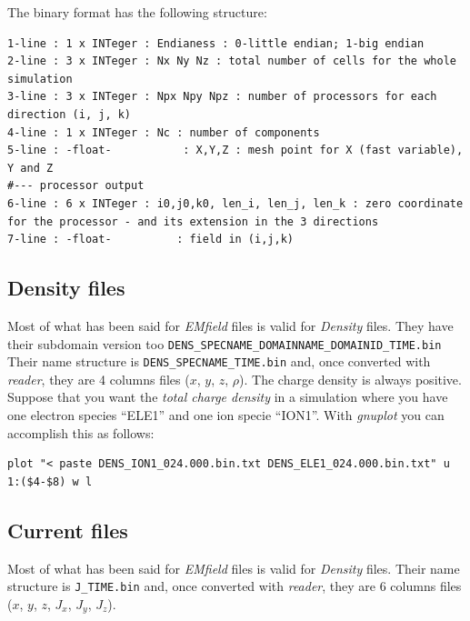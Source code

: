\documentclass[11pt,a4paper]{report}
\begin{document}
The binary format has the following structure:
\begin{verbatim}
1-line : 1 x INTeger : Endianess : 0-little endian; 1-big endian
2-line : 3 x INTeger : Nx Ny Nz : total number of cells for the whole simulation
3-line : 3 x INTeger : Npx Npy Npz : number of processors for each direction (i, j, k)
4-line : 1 x INTeger : Nc : number of components
5-line : -float-           : X,Y,Z : mesh point for X (fast variable), Y and Z
#--- processor output
6-line : 6 x INTeger : i0,j0,k0, len_i, len_j, len_k : zero coordinate for the processor - and its extension in the 3 directions
7-line : -float-          : field in (i,j,k)
\end{verbatim}



\subsection{Density files}
Most of what has been said for \emph{EMfield} files is valid for \emph{Density} files. They have their subdomain version too \verb+DENS_SPECNAME_DOMAINNAME_DOMAINID_TIME.bin+ Their name structure is \verb+DENS_SPECNAME_TIME.bin+ and, once converted with \emph{reader}, they are 4 columns files ($x$, $y$, $z$, $\rho$). The charge density is always positive.\\
Suppose that you want the \emph{total charge density} in a simulation where you have one electron species ``ELE1'' and one ion specie ``ION1''. With \emph{gnuplot} you can accomplish this as follows:
\begin{verbatim}
plot "< paste DENS_ION1_024.000.bin.txt DENS_ELE1_024.000.bin.txt" u 1:($4-$8) w l
\end{verbatim}

\subsection{Current files}
Most of what has been said for \emph{EMfield} files is valid for \emph{Density} files. Their name structure is \verb+J_TIME.bin+ and, once converted with \emph{reader}, they are 6 columns files ($x$, $y$, $z$, $J_x$, $J_y$, $J_z$). 
\end{document}
